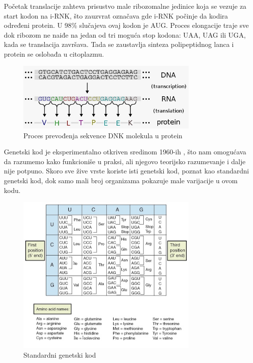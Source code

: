 \documentclass[a4paper,12pt]{article}
\begin{document}
\bigskip
Početak translacije zahteva prisustvo male ribozomalne jedinice koja se vezuje za start kodon na i-RNK, što zauzvrat označava gde i-RNK počinje da kodira određeni protein. U 98\% slučajeva ovaj kodon je AUG. Proces elongacije traje sve dok ribozom ne naiđe na jedan od tri moguća stop kodona: UAA, UAG ili UGA, kada se translacija završava. Tada se zaustavlja sinteza polipeptidnog lanca i protein se oslobađa u citoplazmu.

\newpage
\begin{figure}[h!]
  \centering
  \includegraphics[width=0.8\textwidth]{slika2.jpeg}
  \caption{Proces prevođenja sekvence DNK molekula u protein}
  \label{fig:my_label}
\end{figure}

\bigskip
Genetski kod je eksperimentalno otkriven sredinom 1960-ih \cite{bernfield1965}, što nam omogućava da razumemo kako funkcioniše u praksi, ali njegovo teorijsko razumevanje i dalje nije potpuno. Skoro sve žive vrste koriste isti genetski kod, poznat kao standardni genetski kod, dok samo mali broj organizama pokazuje male varijacije u ovom kodu.


\begin{figure}[h!]
  \centering
  \includegraphics[width=0.8\textwidth]{slika3.jpeg}
  \caption{Standardni genetski kod}
  \label{fig:my_label}
\end{figure}
\end{document}
